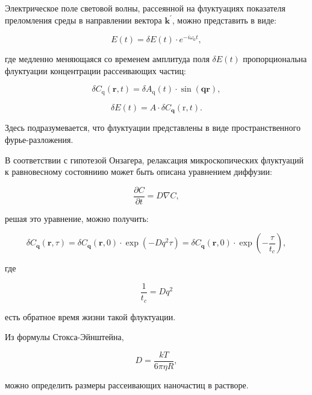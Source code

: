\documentclass[a4paper,12pt]{article} %
\begin{document}
Электрическое поле световой волны, рассеянной на флуктуациях показателя преломления среды в направлении вектора $\boldsymbol{k}^{\prime}$, можно представить в виде:

\begin{equation}
E(t)=\delta E(t) \cdot e^{-i \omega_{0} t},
\end{equation}

где медленно меняющаяся со временем амплитуда поля $\delta E(t)$
пропорциональна флуктуации концентрации рассеивающих частиц:

\begin{equation}
\delta C_{\mathrm{q}}(\boldsymbol{r}, t)=\delta A_{\mathrm{q}}(t) \cdot \sin (\boldsymbol{q} \boldsymbol{r}),
\end{equation}

\begin{equation}
\delta E(t)=A \cdot \delta C_{\mathbf{q}}(\mathrm{r}, t).
\end{equation}

Здесь подразумевается, что флуктуации представлены в виде пространственного фурье-разложения.

В соответствии с гипотезой Онзагера, релаксация микроскопических флуктуаций к равновесному состояниию может быть описана уравнением диффузии:

\begin{equation}
\frac{\partial C}{\partial t}=D \nabla C,
\end{equation}

решая это уравнение, можно получить:

\begin{equation}
\delta C_{\mathbf{q}}(\boldsymbol{r}, \tau)=\delta C_{\mathbf{q}}(\boldsymbol{r}, 0) \cdot \exp \left(-D q^{2} \tau\right)=\delta C_{\mathbf{q}}(\boldsymbol{r}, 0) \cdot \exp \left(-\frac{\tau}{t_{c}}\right),
\end{equation}

где 

\begin{equation}
\frac{1}{t_{c}}=D q^{2}
\end{equation}

есть обратное время жизни такой флуктуации.

Из формулы Стокса-Эйнштейна,

\begin{equation}
D=\frac{k T}{6 \pi \eta R},
\end{equation}

можно определить размеры рассеивающих наночастиц в растворе. 
\end{document}
